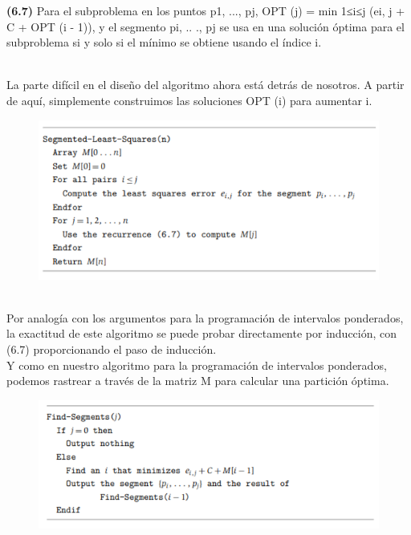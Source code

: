 \documentclass[a4paper]{article}
\begin{document}
\colorbox{mygray}{\parbox{15cm}{
\textbf{(6.7)} Para el subproblema en los puntos p1, ..., pj, OPT (j) = min 1≤i≤j (ei, j + C + OPT (i - 1)), y el segmento pi, .. ., pj se usa en una solución óptima para el subproblema si y solo si el mínimo se obtiene usando el índice i.}}\\

La parte difícil en el diseño del algoritmo ahora está detrás de nosotros. A partir de aquí, simplemente construimos las soluciones OPT (i) para aumentar i.

\begin{figure}[h]
\centering
\includegraphics[scale=1]{Imagenes-Seccion6/cod6_5.PNG}
\end{figure}\\

Por analogía con los argumentos para la programación de intervalos ponderados, la exactitud de este algoritmo se puede probar directamente por inducción, con (6.7) proporcionando el paso de inducción.\\

Y como en nuestro algoritmo para la programación de intervalos ponderados, podemos rastrear a través de la matriz M para calcular una partición óptima.\\

\begin{figure}[h]
\centering
\includegraphics[scale=1]{Imagenes-Seccion6/cod6_6.PNG}
\end{figure}\\
\end{document}
